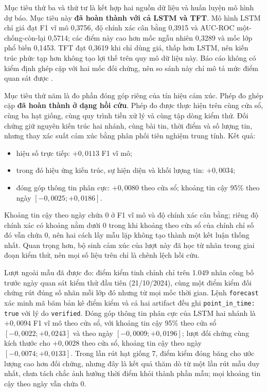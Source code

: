 Mục tiêu thứ ba và thứ tư là kết hợp hai nguồn dữ liệu và huấn luyện mô hình dự báo. Mục
tiêu này \textbf{đã hoàn thành với cả LSTM và TFT}. Mô hình LSTM chỉ giá đạt F1 vĩ mô
0,3756, độ chính xác cân bằng 0,3915 và AUC-ROC một-chống-còn-lại 0,5714; các điểm này cao
hơn mốc ngẫu nhiên 0,3289 và mốc lớp phổ biến 0,1453. TFT đạt 0,3619 khi chỉ dùng giá,
thấp hơn LSTM, nên kiến trúc phức tạp hơn không tạo lợi thế trên quy mô dữ liệu này. Báo
cáo không có kiểm định ghép cặp với hai mốc đối chứng, nên so sánh này chỉ mô tả mức điểm
quan sát được \cite{Halder2022_221107392v1,Gu2024_240716150v1}.

Mục tiêu thứ năm là đo phần đóng góp riêng của tín hiệu cảm xúc. Phép đo ghép cặp \textbf{đã
hoàn thành ở dạng hồi cứu}. Phép đo được thực hiện trên cùng cửa sổ, cùng ba hạt giống,
cùng quy trình tiền xử lý và cùng tập dòng kiểm thử. Đối chứng giữ nguyên kiến trúc hai
nhánh, cùng bài tin, thời điểm và số lượng tin, nhưng thay xác suất cảm xúc bằng phân phối
tiên nghiệm trung tính. Kết quả:

\begin{itemize}[nosep]
  \item hiệu số trực tiếp: $+0{,}0113$ F1 vĩ mô;
  \item trong đó hiệu ứng kiến trúc, sự hiện diện và khối lượng tin: $+0{,}0034$;
  \item đóng góp thông tin phân cực: $+0{,}0080$ theo cửa sổ; khoảng tin cậy 95\%
        theo ngày $[-0{,}0025; +0{,}0186]$.
\end{itemize}

Khoảng tin cậy theo ngày chứa 0 ở F1 vĩ mô và độ chính xác cân bằng; riêng độ chính xác
có khoảng nằm dưới 0 trong khi khoảng theo cửa sổ của chính chỉ số đó vẫn chứa 0, nên hai
cách lấy mẫu lặp không tạo thành một kết luận thống nhất. Quan trọng hơn, bộ sinh cảm xúc
của lượt này đã học từ nhãn trong giai đoạn kiểm thử, nên mọi số liệu trên chỉ là chênh
lệch hồi cứu.

Lượt ngoài mẫu đã được đo: điểm kiểm tinh chỉnh chỉ trên 1.049 nhãn công bố trước
ngày quan sát kiểm thử đầu tiên (21/10/2024), cùng một điểm kiểm đối chứng rút đúng
số nhãn mỗi lớp đó nhưng từ mọi mốc thời gian. Lệnh \texttt{forecast} xác minh mã
băm bản kê điểm kiểm và cả hai artifact đều ghi \texttt{point\_in\_time: true} với
lý do \texttt{verified}. Đóng góp thông tin phân cực của LSTM hai nhánh là
$+0{,}0094$ F1 vĩ mô theo cửa sổ, với khoảng tin cậy 95\% theo cửa sổ
$[-0{,}0022; +0{,}0243]$ và theo ngày $[-0{,}0009; +0{,}0196]$; lượt đối chứng
cùng kích thước cho $+0{,}0028$ theo cửa sổ, khoảng tin cậy theo ngày
$[-0{,}0074; +0{,}0133]$. Trong lần rút hạt giống 7, điểm kiểm đóng băng cho ước
lượng cao hơn đối chứng, nhưng đây là kết quả thăm dò từ một lần rút mẫu duy nhất,
chưa tách chắc ảnh hưởng thời điểm khỏi thành phần mẫu; mọi khoảng tin cậy theo
ngày vẫn chứa 0.

